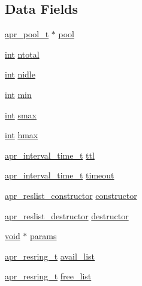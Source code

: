 \subsection*{Data Fields}
\begin{DoxyCompactItemize}
\item 
\hyperlink{structapr__pool__t}{apr\+\_\+pool\+\_\+t} $\ast$ \hyperlink{structapr__reslist__t_a7832b9ebdaf77598d59cba9a3fd75684}{pool}
\item 
\hyperlink{pcre_8txt_a42dfa4ff673c82d8efe7144098fbc198}{int} \hyperlink{structapr__reslist__t_a0606ee3e014954ba68f87606046f163f}{ntotal}
\item 
\hyperlink{pcre_8txt_a42dfa4ff673c82d8efe7144098fbc198}{int} \hyperlink{structapr__reslist__t_a790ff1d71abbb1332889d73159380ff6}{nidle}
\item 
\hyperlink{pcre_8txt_a42dfa4ff673c82d8efe7144098fbc198}{int} \hyperlink{structapr__reslist__t_a19a338fb1e3159b96f43c12347e4cf3c}{min}
\item 
\hyperlink{pcre_8txt_a42dfa4ff673c82d8efe7144098fbc198}{int} \hyperlink{structapr__reslist__t_a4b86641af06860616589bd785920cf8f}{smax}
\item 
\hyperlink{pcre_8txt_a42dfa4ff673c82d8efe7144098fbc198}{int} \hyperlink{structapr__reslist__t_a4f967602cf13cc66032c3a6049c573cb}{hmax}
\item 
\hyperlink{group__apr__time_gaae2129185a395cc393f76fabf4f43e47}{apr\+\_\+interval\+\_\+time\+\_\+t} \hyperlink{structapr__reslist__t_adae72def7c0823ed2e44aa444e1d424a}{ttl}
\item 
\hyperlink{group__apr__time_gaae2129185a395cc393f76fabf4f43e47}{apr\+\_\+interval\+\_\+time\+\_\+t} \hyperlink{structapr__reslist__t_a679ecd7a80b2e44d215bae44ec698a42}{timeout}
\item 
\hyperlink{group__APR__Util__RL_ga57065208a6925b61f5ca96ade452a3d6}{apr\+\_\+reslist\+\_\+constructor} \hyperlink{structapr__reslist__t_a409a52dd18ea4da894867aad0ddbefc3}{constructor}
\item 
\hyperlink{group__APR__Util__RL_gab642eccd03379810b6beb1e7bf009dad}{apr\+\_\+reslist\+\_\+destructor} \hyperlink{structapr__reslist__t_a97b29e666cec105b5bcca4b87659b150}{destructor}
\item 
\hyperlink{group__MOD__ISAPI_gacd6cdbf73df3d9eed42fa493d9b621a6}{void} $\ast$ \hyperlink{structapr__reslist__t_a79f03bd35d84701ea907705b6435dd0e}{params}
\item 
\hyperlink{apr__reslist_8c_a343970829d03668900fe37206ebc6210}{apr\+\_\+resring\+\_\+t} \hyperlink{structapr__reslist__t_a751ab92873f37fde69db7311ac704b39}{avail\+\_\+list}
\item 
\hyperlink{apr__reslist_8c_a343970829d03668900fe37206ebc6210}{apr\+\_\+resring\+\_\+t} \hyperlink{structapr__reslist__t_aa722f4281066316896e43db3e75d8b8e}{free\+\_\+list}
\end{DoxyCompactItemize}


